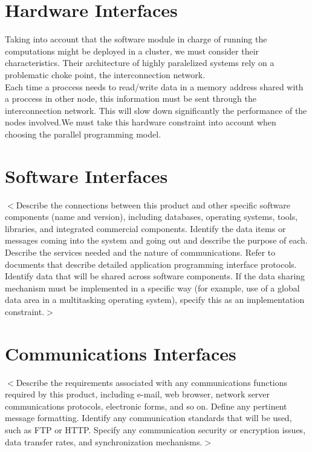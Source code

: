 \documentclass{scrreprt}
\begin{document}
\section{Hardware Interfaces}

Taking into account that the software module in charge of running the
computations might be deployed in a cluster, we must consider their
characteristics. Their architecture of highly paralelized systems rely on
a problematic choke point, the interconnection network.\\

Each time a proccess needs to read/write data in a memory address shared with
a proccess in other node, this information must be sent through the
interconnection network. This will slow down significantly the performance of
the nodes involved.We must take this hardware constraint into account when
choosing the parallel programming model.\\


\section{Software Interfaces}
$<$Describe the connections between this product and other specific software
components (name and version), including databases, operating systems, tools,
libraries, and integrated commercial components. Identify the data items or
messages coming into the system and going out and describe the purpose of each.
Describe the services needed and the nature of communications. Refer to
documents that describe detailed application programming interface protocols.
Identify data that will be shared across software components. If the data
sharing mechanism must be implemented in a specific way (for example, use of a
global data area in a multitasking operating system), specify this as an
implementation constraint.$>$

\section{Communications Interfaces}

$<$Describe the requirements associated with any communications functions
required by this product, including e-mail, web browser, network server
communications protocols, electronic forms, and so on. Define any pertinent
message formatting. Identify any communication standards that will be used, such
as FTP or HTTP. Specify any communication security or encryption issues, data
transfer rates, and synchronization mechanisms.$>$
\end{document}
